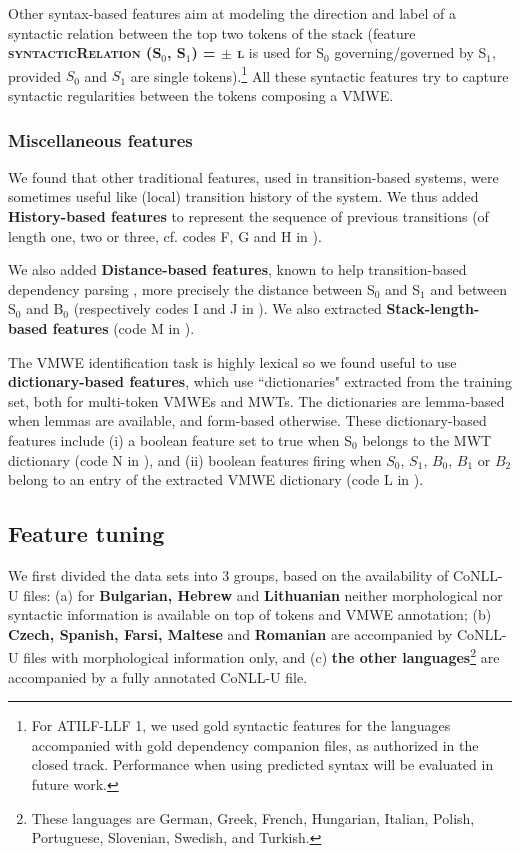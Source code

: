 \documentclass[output=paper,modfonts]{langscibook}
\begin{document}
Other syntax-based features aim at modeling the direction and label of a syntactic relation between the top two tokens of the stack (feature \textbf{\textsc{syntacticRelation (S$_0$, S$_1$) = $\pm$ l }} is used for S$_0$ governing/governed by S$_1$, provided $S_0$ and $S_1$ are single tokens).\footnote{For ATILF-LLF 1, we used gold syntactic features for the languages accompanied with gold dependency companion files, as authorized in the closed track. Performance when using predicted syntax will be evaluated in future work.} All these syntactic features try to capture syntactic regularities between the tokens composing a VMWE.
\subsubsection*{Miscellaneous features}
We found that other traditional features, used in transition-based systems,  were sometimes useful like  (local) transition history of the system. We thus added \textbf{History-based features} to represent the sequence of previous transitions (of length one, two or three, cf. codes F, G and H \-in  ).

We also added \textbf{Distance-based features}, known to help transition-based dependency parsing \citep{zhang2011transition}, more precisely the distance between S$_0$ and  S$_1$ and between S$_0$ and B$_0$ (respectively codes I and J in ). We also extracted \textbf{Stack-length-based features} (code M in  ).

The VMWE identification task is highly lexical so we found useful to use \textbf{dictionary-based features}, which use ``dictionaries" extracted from the training set, both for multi-token VMWEs and MWTs. The dictionaries are lemma-based when lemmas are available, and form-based otherwise. These dictionary-based features include (i) a boolean feature set to true when S$_0$ belongs to the MWT dictionary (code N in  ), and (ii) boolean features firing when $S_0$, $S_1$, $B_0$, $B_1$ or $B_2$ belong to an entry of the extracted VMWE dictionary (code L in ).
\subsection{Feature tuning}
\label{ss:tuning}
We first divided the data sets into 3 groups, based on the availability of CoNLL-U files: (a) for \textbf{Bulgarian, Hebrew} and \textbf{Lithuanian} neither morphological nor syntactic information is available on top of tokens and VMWE annotation; (b) \textbf{Czech, Spanish, Farsi, Maltese} and \textbf{Romanian} are accompanied by CoNLL-U files with morphological information only, and (c) \textbf{the other languages}\footnote{These languages are German, Greek, French, Hungarian, Italian, Polish, Portuguese, Slovenian, Swedish, and Turkish.} 
are accompanied by a fully annotated CoNLL-U file. 
\end{document}
